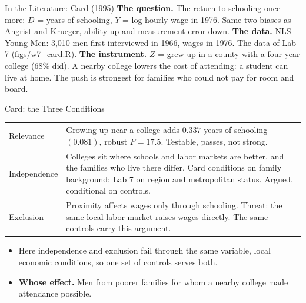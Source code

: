 \documentclass[aspectratio=169,11pt,xcolor=dvipsnames]{beamer}
\newcommand{\srcp}[1]{{\scriptsize\color{gray}(#1)}}
\begin{document}
\begin{frame}{In the Literature: Card (1995)}
\textbf{The question.} The return to schooling once more: $D$ = years of
schooling, $Y$ = log hourly wage in 1976. Same two biases as Angrist and
Krueger, ability up and measurement error down.
\vskip3pt
\textbf{The data.} NLS Young Men: 3,010 men first interviewed in 1966, wages
in 1976. The data of Lab 7 \srcp{figs/w7\_card.R}.
\vskip3pt
\textbf{The instrument.} $Z$ = grew up in a county with a four-year college
(68\% did). A nearby college lowers the cost of attending: a student can live
at home. The push is strongest for families who could not pay for room and
board.
\end{frame}

\begin{frame}{Card: the Three Conditions}
\begin{center}\footnotesize
\renewcommand{\arraystretch}{1.15}
\begin{tabular}{@{}lp{10.6cm}@{}}
\toprule
Relevance & Growing up near a college adds $0.337$ years of schooling
  $(0.081)$, robust $F = 17.5$. \alert{Testable, passes, not strong.} \\
Independence & Colleges sit where schools and labor markets are better, and
  the families who live there differ. Card conditions on family background;
  Lab 7 on region and metropolitan status. Argued, conditional on controls. \\
Exclusion & Proximity affects wages only through schooling. Threat: the
  same local labor market raises wages directly. The same controls carry
  this argument. \\
\bottomrule
\end{tabular}
\end{center}
\vskip2pt
\begin{itemize}\itemsep2pt
  \item Here independence and exclusion fail through the same variable,
        local economic conditions, so one set of controls serves both.
  \item \textbf{Whose effect.} Men from poorer families for whom a nearby
        college made attendance possible.
\end{itemize}
\end{frame}
\end{document}
